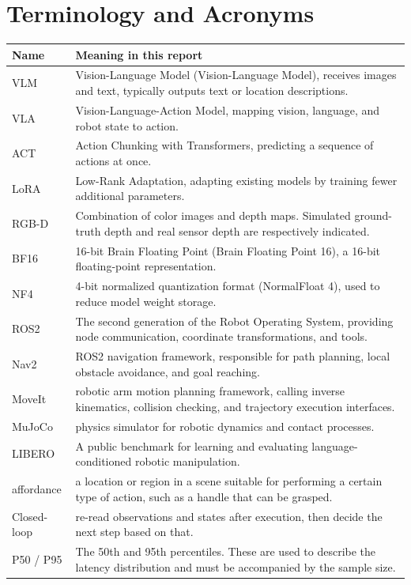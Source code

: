 \chapter{Terminology and Acronyms}
\begin{longtable}{p{.18\linewidth}p{.72\linewidth}}
\toprule Name & Meaning in this report \\\midrule\endhead
VLM & Vision-Language Model (Vision-Language Model), receives images and text, typically outputs text or location descriptions.\\
VLA & Vision-Language-Action Model, mapping vision, language, and robot state to action.\\
ACT & Action Chunking with Transformers, predicting a sequence of actions at once.\\
LoRA & Low-Rank Adaptation, adapting existing models by training fewer additional parameters.\\
RGB-D & Combination of color images and depth maps. Simulated ground-truth depth and real sensor depth are respectively indicated.\\
BF16 & 16-bit Brain Floating Point (Brain Floating Point 16), a 16-bit floating-point representation.\\
NF4 & 4-bit normalized quantization format (NormalFloat 4), used to reduce model weight storage.\\
ROS2 & The second generation of the Robot Operating System, providing node communication, coordinate transformations, and tools.\\
Nav2 & ROS2 navigation framework, responsible for path planning, local obstacle avoidance, and goal reaching.\\
MoveIt & robotic arm motion planning framework, calling inverse kinematics, collision checking, and trajectory execution interfaces.\\
MuJoCo & physics simulator for robotic dynamics and contact processes.\\
LIBERO & A public benchmark for learning and evaluating language-conditioned robotic manipulation.\\
affordance & a location or region in a scene suitable for performing a certain type of action, such as a handle that can be grasped.\\
Closed-loop & re-read observations and states after execution, then decide the next step based on that.\\
P50 / P95 & The 50th and 95th percentiles. These are used to describe the latency distribution and must be accompanied by the sample size.\\

\end{longtable}
